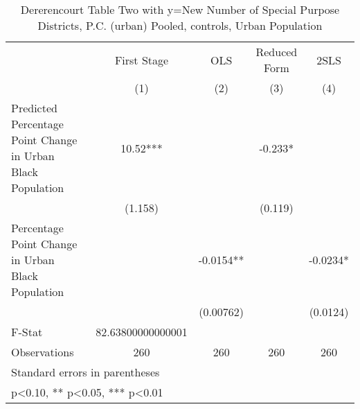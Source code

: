 \begin{table}[htbp]\centering
\def\sym#1{\ifmmode^{#1}\else\(^{#1}\)\fi}
\caption{Dererencourt Table Two with y=New Number of Special Purpose Districts, P.C. (urban)  Pooled,  controls, Urban Population}
\begin{tabular}{l*{4}{c}}
\toprule
                    & First Stage   &         OLS   &Reduced Form   &        2SLS   \\
                    &\multicolumn{1}{c}{(1)}   &\multicolumn{1}{c}{(2)}   &\multicolumn{1}{c}{(3)}   &\multicolumn{1}{c}{(4)}   \\
\midrule
Predicted Percentage Point Change in Urban Black Population&       10.52***&               &      -0.233*  &               \\
                    &     (1.158)   &               &     (0.119)   &               \\
\addlinespace
Percentage Point Change in Urban Black Population&               &     -0.0154** &               &     -0.0234*  \\
                    &               &   (0.00762)   &               &    (0.0124)   \\
\midrule
F-Stat              &82.63800000000001   &               &               &               \\
Observations        &         260   &         260   &         260   &         260   \\
\bottomrule
\multicolumn{5}{l}{\footnotesize Standard errors in parentheses}\\
\multicolumn{5}{l}{\footnotesize * p<0.10, ** p<0.05, *** p<0.01}\\
\end{tabular}
\end{table}
